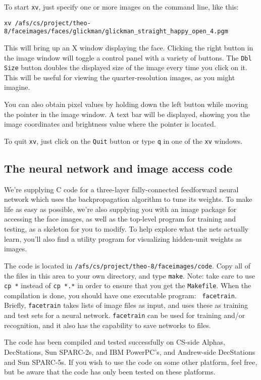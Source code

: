 To start {\tt xv}, just specify one or more images on the command line,
like this:

{\tt xv /afs/cs/project/theo-8/faceimages/faces/glickman/glickman\_straight\_happy\_open\_4.pgm}

This will bring up an X window displaying the face.  Clicking the right button
in the image window will toggle a control panel with a variety of buttons.
The {\tt Dbl Size} button doubles the displayed size of the image every time
you click on it.  This will be useful for viewing the quarter-resolution
images, as you might imagine.

You can also obtain pixel values by holding down the left button while moving
the pointer in the image window.  A text bar will be displayed, showing you
the image coordinates and brightness value where the pointer is located.

To quit {\tt xv}, just click on the {\tt Quit} button or type {\tt q}
in one of the {\tt xv} windows.

\subsection{The neural network and image access code}

We're supplying C code for a three-layer fully-connected feedforward
neural network which uses the backpropagation algorithm to tune its weights.
To make life as easy as possible, we're also supplying you with an image
package for accessing the face images, as well as the top-level
program for training and testing, as a skeleton for you to modify.
To help explore what the nets actually learn, you'll also find a
utility program for visualizing hidden-unit weights as images.

The code is located in {\tt /afs/cs/project/theo-8/faceimages/code}.  Copy all
of the files in this area to your own directory, and type {\tt make}. 
Note: take care to use {\tt cp *} instead of {\tt cp *.*} in order 
to ensure that you get the {\tt Makefile}. When
the compilation is done, you should have one executable program: {\tt
facetrain}.  Briefly, {\tt facetrain} takes lists of image files as input, and
uses these as training and test sets for a neural network.  {\tt facetrain}
can be used for training and/or recognition, and it also has the capability to
save networks to files.

The code has been compiled and tested successfully on CS-side Alphas,
DecStations, Sun SPARC-2s, and IBM PowerPC's, and Andrew-side DecStations and
Sun SPARC-5s.  If you wish to use the code on some other platform, feel free,
but be aware that the code has only been tested on these platforms.  

